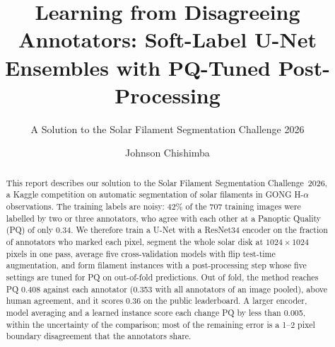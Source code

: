 \documentclass[sigconf]{acmart}
\begin{document}
\title[Learning from Disagreeing Annotators]{Learning from Disagreeing Annotators: Soft-Label U-Net Ensembles with PQ-Tuned Post-Processing}  %
\subtitle{A Solution to the Solar Filament Segmentation Challenge 2026} %


\author{Johnson Chishimba}

\begin{abstract}
    This report describes our solution to the Solar Filament Segmentation Challenge~2026, a Kaggle competition on automatic segmentation of solar filaments in GONG H-$\alpha$ observations. The training labels are noisy: 42\% of the 707 training images were labelled by two or three annotators, who agree with each other at a Panoptic Quality (PQ) of only 0.34. We therefore train a U-Net with a ResNet34 encoder on the fraction of annotators who marked each pixel, segment the whole solar disk at $1024\times1024$ pixels in one pass, average five cross-validation models with flip test-time augmentation, and form filament instances with a post-processing step whose five settings are tuned for PQ on out-of-fold predictions. Out of fold, the method reaches PQ 0.408 against each annotator (0.353 with all annotators of an image pooled), above human agreement, and it scores 0.36 on the public leaderboard. A larger encoder, model averaging and a learned instance score each change PQ by less than 0.005, within the uncertainty of the comparison; most of the remaining error is a 1--2 pixel boundary disagreement that the annotators share.
\end{abstract}

\maketitle

\ifguideStyle
{}
\par\medskip
\fi


\end{document}
